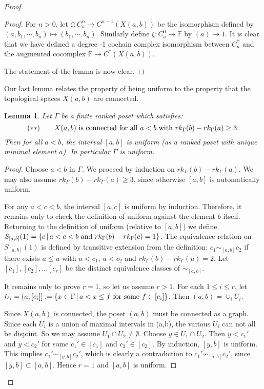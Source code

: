 \documentclass[11pt,righttag]{amsart}
\newtheorem{lemma}[thm]{Lemma}
\theoremstyle{definition}
\begin{document}
\begin{proof}
\begin{proof}
For $n>0$, let $\zeta: C_a^n\to C^{n-1}(X(a,b))$ be the isomorphism defined by 
$(a,b_1,\cdots,b_n) \mapsto (b_1,\cdots,b_n)$.  Similarly define $\zeta: C_a^0\to {{\mathbb F}}$ by $(a) \mapsto 1$.  It is clear that we have defined a degree -1 cochain complex isomorphism between $C_a^*$ and the augmented cocomplex ${{\mathbb F}} \to C^*(X(a,b))$.

The statement of the lemma is now clear. 
\end{proof}

Our last lemma relates the property of being uniform to the property that the topological spaces $X(a,b)$ are connected.

\begin{lemma}\label{lemma3} Let $\Gamma$ be a finite ranked poset which satisfies:
$$(**)\qquad X(a,b) \hbox{ is connected for all } a<b \hbox{ with } rk_\Gamma(b)-rk_\Gamma(a) \ge 3.$$
Then for all $a<b$, the interval $[a,b]$ is uniform (as a ranked poset with unique minimal element $a$).  In particular $\Gamma$ is uniform.

\end{lemma}

\begin{proof}
Choose $a<b$ in $\Gamma$.  We proceed by induction on 
$rk_\Gamma(b)-rk_\Gamma(a)$.  We may also assume 
$rk_\Gamma(b)-rk_\Gamma(a) \ge 3$, since otherwise $[a,b]$ is 
automatically uniform.  

For any $a<c<b$, the interval $[a,c]$ is uniform by induction.  Therefore, it 
remains only to check the definition of uniform against the element $b$ itself.
Returning to the definition of uniform (relative to $[a,b]$) we define 
$S_{[a,b]}(1) = \{ c \,|\, a<c<b \hbox{ and } rk_\Gamma(b)-rk_\Gamma(c)=1\}$.  
The equivalence relation on $S_{[a,b]}(1)$ is defined by transitive extension 
from the definition: $c_1\sim_{[a,b]} c_2$ if there exists $a\le u$ with $u<c_1$, $u<c_2$ and 
$rk_\Gamma(b)-rk_\Gamma(u) = 2$. Let $[c_1], [c_2],\ldots [c_r]$ be the distinct equivalence classes of $\sim_{[a,b]}$. 

It remains only to prove $r=1$, so let us assume $r>1$.  For each $1\le i\le r$, let 
$U_i = (a,[c_i]]:= \{x\in \Gamma\, |\, a<x\le f \hbox{ for some } f\in [c_i]\}$.  Then 
$(a,b) = \cup_i U_i$.  

Since $X(a,b)$ is connected, the poset $(a,b)$ must be connected as a graph.  Since each $U_i$ is a union of maximal intervals in (a,b), the various $U_i$ can not all be disjoint. So we may assume 
$U_1\cap U_2 \not= \emptyset$.  
Choose $y\in U_1\cap U_2$.  Then $y<c_1'$ and $y<c_2'$ for some $c_1'\in [c_1]$ 
and $c_2'\in [c_2]$.  By induction, $[y,b]$ is uniform.  This implies 
$c_1' \sim_{[y,b]} c_2'$, which is clearly a contradiction to $c_1'\not\sim_{[a,b]}c_2'$, since $[y,b] \subset [a,b]$.   Hence $r=1$ and $[a,b]$ is uniform.
\end{proof}


\end{proof}
\end{document}
